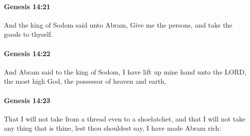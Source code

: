 		\paragraph{Genesis 14:21} %
			\label{GENESIS-14-21}

			And the king of Sodom said unto Abram, Give me the persons, and take the goods to thyself.


		\paragraph{Genesis 14:22} %
			\label{GENESIS-14-22}

			And Abram said to the king of Sodom, I have lift up mine hand unto the LORD, the most high God, the possessor of heaven and earth,


		\paragraph{Genesis 14:23} %
			\label{GENESIS-14-23}

			That I will not take from a thread even to a shoelatchet, and that I will not take any thing that is thine, lest thou shouldest say, I have made Abram rich:


